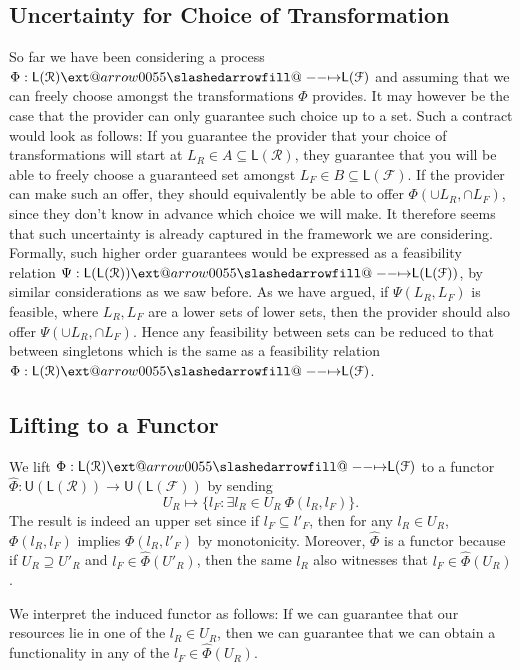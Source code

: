 \documentclass[12pt]{article}
\makeatletter
\theoremstyle{definition}
\theoremstyle{plain}
\theoremstyle{plain}
\theoremstyle{plain}
\theoremstyle{plain}
\theoremstyle{remark}
\theoremstyle{remark}
\newcommand{\mc}[1]{\mathcal{#1}}
\newcommand{\sub}{\subseteq}
\newcommand{\low}{\mathsf{L}}
\newcommand{\upper}{\mathsf{U}}
\def\slashedarrowfill@#1#2#3#4#5{%
	$\m@th\thickmuskip0mu\medmuskip\thickmuskip\thinmuskip\thickmuskip
	\relax#5#1\mkern-7mu%
	\cleaders\hbox{$#5\mkern-2mu#2\mkern-2mu$}\hfill
	\mathclap{#3}\mathclap{#2}%
	\cleaders\hbox{$#5\mkern-2mu#2\mkern-2mu$}\hfill
	\mkern-7mu#4$%
}
\def\rightslashedarrowfill@{%
	\slashedarrowfill@\relbar\relbar\mapstochar\rightarrow}
\newcommand\xslashedrightarrow[2][]{%
	\ext@arrow 0055{\rightslashedarrowfill@}{#1}{#2}}
\makeatother
\begin{document}
\subsection{Uncertainty for Choice of Transformation}
So far we have been considering a process $\Phi: \low(\mc{R}) \xslashedrightarrow{} \low(\mc{F})$ and assuming that we can freely choose amongst the transformations $\Phi$ provides. It may however be the case that the provider can only guarantee such choice up to a set. Such a contract would look as follows: If you guarantee the provider that your choice of transformations will start at $L_R \in  A \sub \low(\mc{R})$, they guarantee that you will be able to freely choose a guaranteed set amongst $L_F \in B \sub \low(\mc{F})$. If the provider can make such an offer, they should equivalently be able to offer $\Phi(\cup L_R, \cap L_F)$, since they don't know in advance which choice we will make. It therefore seems that such uncertainty is already captured in the framework we are considering. 
Formally, such higher order guarantees would be expressed as a feasibility relation $\Psi: \low(\low(\mc{R})) \xslashedrightarrow{} \low(\low(\mc{F}))$, by similar considerations as we saw before. As we have argued, if $\Psi(L_R,L_F)$ is feasible, where $L_R,L_F$ are a lower sets of lower sets, then the provider should also offer $\Psi(\cup L_R, \cap L_F)$. Hence any feasibility between sets can be reduced to that between singletons which is the same as a feasibility relation $\Phi: \low(\mc{R}) \xslashedrightarrow{} \low(\mc{F})$.

\subsection{Lifting to a Functor}
We lift $\Phi: \low(\mc{R}) \xslashedrightarrow{} \low(\mc{F})$ to a functor $\hat \Phi: \upper(\low(\mc{R})) \rightarrow \upper(\low(\mc{F}))$ by sending 
$$U_R \mapsto \{l_F : \exists l_R \in U_R \: \Phi(l_R,l_F) \}.$$
The result is indeed an upper set since if $l_F \sub l'_F$, then for any $l_R \in U_R$, $\Phi(l_R,l_F)$ implies $\Phi(l_R,l'_F)$ by monotonicity. Moreover, $\hat \Phi$ is a functor because if $U_R \supseteq U'_R$ and $l_F \in \hat\Phi(U'_R)$, then the same $l_R$ also witnesses that $l_F \in \hat\Phi(U_R)$.

We interpret the induced functor as follows: If we can guarantee that our resources lie in one of the $l_R \in U_R$, then we can guarantee that we can obtain a functionality in any of the $l_F \in \hat\Phi(U_R)$.
\end{document}

